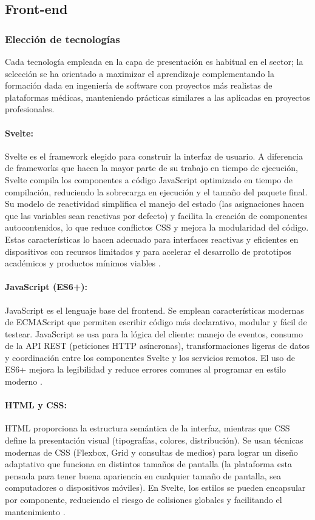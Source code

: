 \documentclass[12pt, a4paper]{article}
\begin{document}
\subsection{Front‑end}

\subsubsection{Elección de tecnologías}

Cada tecnología empleada en la capa de presentación es habitual en el sector; la selección se ha orientado a maximizar el aprendizaje complementando la formación dada en ingeniería de software con proyectos más realistas de plataformas médicas, manteniendo prácticas similares a las aplicadas en proyectos profesionales.

\paragraph{Svelte:}
Svelte es el framework elegido para construir la interfaz de usuario. A diferencia de frameworks que hacen la mayor parte de su trabajo en tiempo de ejecución, Svelte compila los componentes a código JavaScript optimizado en tiempo de compilación, reduciendo la sobrecarga en ejecución y el tamaño del paquete final. Su modelo de reactividad simplifica el manejo del estado (las asignaciones hacen que las variables sean reactivas por defecto) y facilita la creación de componentes autocontenidos, lo que reduce conflictos CSS y mejora la modularidad del código. Estas características lo hacen adecuado para interfaces reactivas y eficientes en dispositivos con recursos limitados y para acelerar el desarrollo de prototipos académicos y productos mínimos viables \cite{Svelte}.

\paragraph{JavaScript (ES6+):}
JavaScript es el lenguaje base del frontend. Se emplean características modernas de ECMAScript que permiten escribir código más declarativo, modular y fácil de testear. JavaScript se usa para la lógica del cliente: manejo de eventos, consumo de la API REST (peticiones HTTP asíncronas), transformaciones ligeras de datos y coordinación entre los componentes Svelte y los servicios remotos. El uso de ES6+ mejora la legibilidad y reduce errores comunes al programar en estilo moderno \cite{JSMDN}.

\paragraph{HTML y CSS:}
HTML proporciona la estructura semántica de la interfaz, mientras que CSS define la presentación visual (tipografías, colores, distribución). Se usan técnicas modernas de CSS (Flexbox, Grid y consultas de medios) para lograr un diseño adaptativo que funciona en distintos tamaños de pantalla (la plataforma esta pensada para tener buena apariencia en cualquier tamaño de pantalla, sea computadores o dispositivos móviles). En Svelte, los estilos se pueden encapsular por componente, reduciendo el riesgo de colisiones globales y facilitando el mantenimiento \cite{HTMLMDN}\cite{CSSMDN}.
\end{document}
